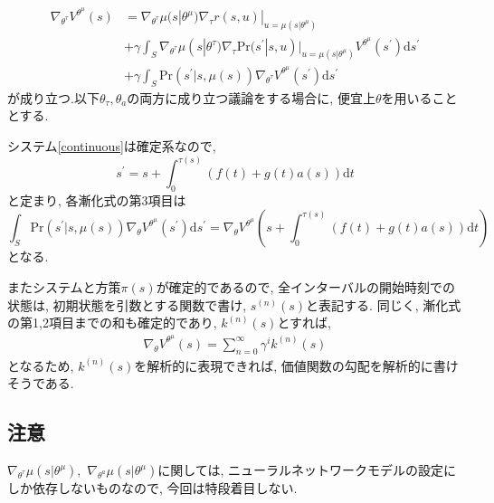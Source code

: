 \documentclass{jsarticle}
\begin{document}
\begin{align}
	\nabla_{\theta^{\tau}}V^{\theta^{\mu}}(s) &= \nabla_{\theta^{\tau}}\mu(s|\theta^{\mu})\nabla_{\tau}r(s, u)|_{u=\mu(s|\theta^{\mu})}\nonumber\\
	&+\gamma\int_{S}\nabla_{\theta^{\tau}}\mu(s|\theta^{\tau})\nabla_{\tau}\textrm{Pr}(s^{\prime}|s, u)|_{u=\mu(s|\theta^{\mu})}V^{\theta^{\mu}}(s^{\prime})\textrm{d}s^{\prime}\nonumber\\
	&+\gamma\int_{S}\textrm{Pr}(s^{\prime}|s, \mu(s))\nabla_{\theta^{\tau}}V^{\theta^{\mu}}(s^{\prime})\textrm{d}s^{\prime} \label{recurrence_tau}
\end{align}が成り立つ.以下$\theta_{\tau}, \theta_a$の両方に成り立つ議論をする場合に, 便宜上$\theta$を用いることとする.  \par
システム\eqref{continuous}は確定系なので, 
\begin{equation}
	s^{\prime} = s + \int_{0}^{\tau(s)}(f(t)+g(t)a(s))\textrm{d}t
\end{equation}
と定まり, 各漸化式の第3項目は
\begin{equation}
	\int_{S}\textrm{Pr}(s^{\prime}|s, \mu(s))\nabla_{\theta}V^{\theta^{\mu}}(s^{\prime})\textrm{d}s^{\prime}=\nabla_{\theta}V^{\theta^{\mu}}(s + \int_{0}^{\tau(s)}(f(t)+g(t)a(s))\textrm{d}t)
\end{equation}
となる.\par
またシステムと方策$\pi(s)$が確定的であるので, 全インターバルの開始時刻での状態は, 初期状態を引数とする関数で書け, $s^{(n)}(s)$と表記する. 同じく, 漸化式の第1,2項目までの和も確定的であり, $k^{(n)}(s)$とすれば, 
\begin{align}
	\nabla_{\theta}V^{\theta^{\mu}}(s) = \sum_{n=0}^{\infty} \gamma^{i}k^{(n)}(s)
\end{align}
となるため, $k^{(n)}(s)$を解析的に表現できれば, 価値関数の勾配を解析的に書けそうである.

\subsection{注意}
$\nabla_{\theta^{\tau}}\mu(s|\theta^{\mu})$,~$\nabla_{\theta^{a}}\mu(s|\theta^{\mu})$に関しては, ニューラルネットワークモデルの設定にしか依存しないものなので, 今回は特段着目しない.
\end{document}

